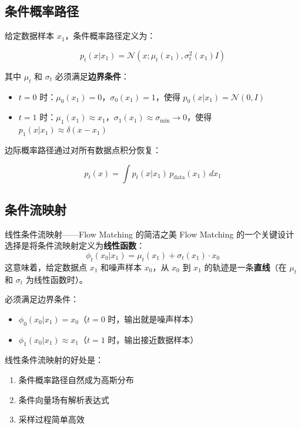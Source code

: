 \documentclass[a4paper]{article}
\begin{document}
\subsection{条件概率路径}

给定数据样本 $x_1$，条件概率路径定义为：

$$p_t(x | x_1) = \mathcal{N}(x; \mu_t(x_1), \sigma_t^2(x_1) I)$$

其中 $\mu_t$ 和 $\sigma_t$ 必须满足\textbf{边界条件}：
\begin{itemize}
    \item $t = 0$ 时：$\mu_0(x_1) = 0$，$\sigma_0(x_1) = 1$，使得 $p_0(x | x_1) = \mathcal{N}(0, I)$
    \item $t = 1$ 时：$\mu_1(x_1) \approx x_1$，$\sigma_1(x_1) \approx \sigma_{\min} \to 0$，使得 $p_1(x | x_1) \approx \delta(x - x_1)$
\end{itemize}

边际概率路径通过对所有数据点积分恢复：

$$p_t(x) = \int p_t(x | x_1) \, p_{\text{data}}(x_1) \, dx_1$$

\subsection{条件流映射}

\begin{importantbox}{线性条件流映射——Flow Matching 的简洁之美}
Flow Matching 的一个关键设计选择是将条件流映射定义为\textbf{线性函数}：
$$\phi_t(x_0 | x_1) = \mu_t(x_1) + \sigma_t(x_1) \cdot x_0$$
这意味着，给定数据点 $x_1$ 和噪声样本 $x_0$，从 $x_0$ 到 $x_1$ 的轨迹是一条\textbf{直线}（在 $\mu_t$ 和 $\sigma_t$ 为线性函数时）。

必须满足边界条件：
\begin{itemize}
    \item $\phi_0(x_0 | x_1) = x_0$（$t=0$ 时，输出就是噪声样本）
    \item $\phi_1(x_0 | x_1) \approx x_1$（$t=1$ 时，输出接近数据样本）
\end{itemize}
\end{importantbox}

线性条件流映射的好处是：
\begin{enumerate}
    \item 条件概率路径自然成为高斯分布
    \item 条件向量场有解析表达式
    \item 采样过程简单高效
\end{enumerate}
\end{document}
